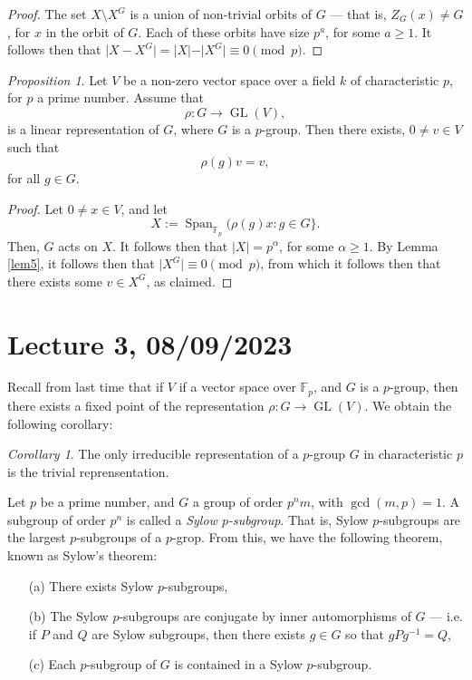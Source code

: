 \documentclass[a4paper]{report}
\theoremstyle{definition}
\theoremstyle{remark}
\theoremstyle{proposition}
\newtheorem{proposition}{Proposition}
\theoremstyle{conjecture}
\theoremstyle{lemma}
\theoremstyle{corollary}
\newtheorem{corollary}{Corollary}
\theoremstyle{exercise}
\theoremstyle{example}
\newcommand{\on}{\operatorname}
\begin{document}
\begin{proof}
    The set $X\setminus X^G$ is a union of non-trivial orbits of 
    $G$ --- that is, $Z_G(x) \neq G$, for $x$ in the orbit of $G$.
    Each of these orbits have size $p^a$, for some $a\geq 1$.
    It follows then that $\vert X - X^G\vert = \vert X \vert - \vert X^G\vert \equiv 0 \pmod{p}$.
\end{proof}

\begin{proposition}
    Let $V$ be a non-zero vector space over a field $k$ of characteristic 
    $p$, for $p$ a prime number. Assume that 
    $$\rho : G \longrightarrow \on{GL}(V),$$ is a linear representation of 
    $G$, where $G$ is a $p$-group. Then there exists, $0\neq v \in V$ 
    such that $$\rho(g)v = v,$$ for all $g\in G$.
\end{proposition}

\begin{proof}
    Let $0\neq x \in V$, and let 
    $$X := \on{Span}_{\mathbb{F}_p}(\rho(g)x : g\in G\rbrace.$$
    Then, $G$ acts on $X$. It follows then that 
    $\vert X \vert = p^\alpha$, for some $\alpha \geq 1$.
    By Lemma \ref{lem5}, it follows then that 
    $\vert X^G\vert \equiv 0 \pmod{p}$, from which it follows then that 
    there exists some $v \in X^G$, as claimed.
\end{proof}


\section{Lecture 3, 08/09/2023}

Recall from last time that if $V$ if a vector space over $\mathbb{F}_p$,
and $G$ is a $p$-group, then there exists a fixed point 
of the representation $\rho : G \to \on{GL}(V)$. We 
obtain the following corollary:

\begin{corollary}
    The only irreducible representation of a $p$-group $G$ in characteristic
    $p$ is the trivial reprensentation.
\end{corollary}

Let $p$ be a prime number, and $G$ a group of order $p^nm$, with 
$\gcd(m,p) = 1$. A subgroup of order $p^n$ is called a \emph{Sylow 
$p$-subgroup}. That is, Sylow $p$-subgroups are the largest 
$p$-subgroups of a $p$-grop. 
From this, we have the following theorem, known as Sylow's theorem:

\begin{theorem}
    \leavevmode
    \begin{itemize}
        \item[(a)] There exists Sylow $p$-subgroups,
        \item[(b)] The Sylow $p$-subgroups are conjugate by inner automorphisms
            of $G$ --- i.e. if $P$ and $Q$ are Sylow subgroups, then there 
            exists $g\in G$ so that $gPg^{-1}=Q$,
        \item[(c)] Each $p$-subgroup of $G$ is contained in a Sylow 
            $p$-subgroup.
    \end{itemize}
\end{theorem}
\end{document}
